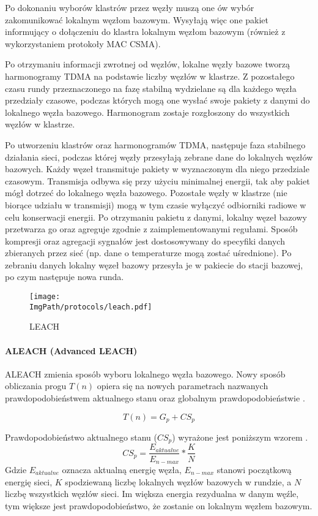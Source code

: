 Po dokonaniu wyborów klastrów przez węzły muszą one ów wybór zakomunikować lokalnym węzłom bazowym. Wysyłają więc one pakiet informujący o dołączeniu do klastra lokalnym węzłom bazowym (również z wykorzystaniem protokoły MAC CSMA).

Po otrzymaniu informacji zwrotnej od węzłów, lokalne węzły bazowe tworzą harmonogramy TDMA na podstawie liczby węzłów w klastrze. Z pozostałego czasu rundy przeznaczonego na fazę stabilną wydzielane są dla każdego węzła przedziały czasowe, podczas których mogą one wysłać swoje pakiety z danymi do lokalnego węzła bazowego. Harmonogram zostaje rozgłoszony do wszystkich węzłów w klastrze.

Po utworzeniu klastrów oraz harmonogramów TDMA, następuje faza stabilnego działania sieci, podczas której węzły przesyłają zebrane dane do lokalnych węzłów bazowych. Każdy węzeł transmituje pakiety w wyznaczonym dla niego przedziale czasowym. Transmisja odbywa się przy użyciu minimalnej energii, tak aby pakiet mógł dotrzeć do lokalnego węzła bazowego. Pozostałe węzły w klastrze (nie biorące udziału w transmisji) mogą w tym czasie wyłączyć odbiorniki radiowe w celu konserwacji energii. Po otrzymaniu pakietu z danymi, lokalny węzeł bazowy przetwarza go oraz agreguje zgodnie z zaimplementowanymi regułami. Sposób kompresji oraz agregacji sygnałów jest dostosowywany do specyfiki danych zbieranych przez sieć (np. dane o temperaturze mogą zostać uśrednione). Po zebraniu danych lokalny węzeł bazowy przesyła je w pakiecie do stacji bazowej, po czym następuje nowa runda.
\begin{figure}[H]
	\begin{center}
		\texttt{[image: \\ImgPath/protocols/leach.pdf]}
	\end{center}
	\caption{LEACH}
\end{figure}
\paragraph{ALEACH (Advanced LEACH)} \label{para:aleach}
ALEACH zmienia sposób wyboru lokalnego węzła bazowego. Nowy sposób obliczania progu $T(n)$ opiera się na nowych parametrach nazwanych prawdopodobieństwem aktualnego stanu oraz globalnym prawdopodobieństwie \cite{Ali2008}.

\[
	T(n) = G_{p} + CS_{p}
\]

Prawdopodobieństwo aktualnego stanu ($CS_{p}$) wyrażone jest poniższym wzorem \cite{Ali2008}.
\[
	CS_{p} = \frac{E_{aktualne}}{E_{n-max}}*\frac{K}{N}
\]
Gdzie $E_{aktualne}$ oznacza aktualną energię węzła, $E_{n-max}$ stanowi początkową energię sieci, $K$ spodziewaną liczbę lokalnych węzłów bazowych w rundzie, a $N$ liczbę wszystkich węzłów sieci. Im większa energia rezydualna w danym węźle, tym większe jest prawdopodobieństwo, że zostanie on lokalnym węzłem bazowym.


